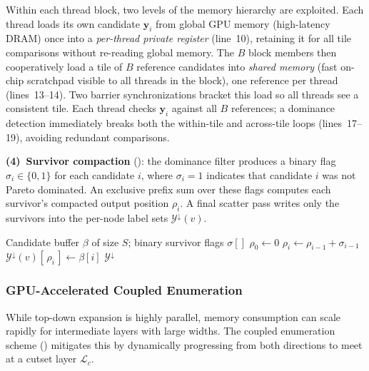 \documentclass[letterpaper]{article}
\begin{document}
Within each thread block, two levels of the memory hierarchy are exploited. Each thread loads its own candidate $\mathbf{y}_i$ from global GPU memory (high-latency DRAM) once into a \emph{per-thread private register} (line~10), retaining it for all tile comparisons without re-reading global memory. The $B$ block members then cooperatively load a tile of $B$ reference candidates into \emph{shared memory} (fast on-chip scratchpad visible to all threads in the block), one reference per thread (lines~13--14). Two barrier synchronizations bracket this load so all threads see a consistent tile. Each thread checks $\mathbf{y}_i$ against all $B$ references; a dominance detection immediately breaks both the within-tile and across-tile loops (lines~17--19), avoiding redundant comparisons.

\textbf{(4)~Survivor compaction} (): the dominance filter produces a binary flag $\sigma_i \in \{0, 1\}$ for each candidate $i$, where $\sigma_i = 1$ indicates that candidate $i$ was not Pareto dominated. An exclusive prefix sum over these flags computes each survivor's compacted output position $\rho_i$. A final scatter pass writes only the survivors into the per-node label sets $\mathcal{Y}^{\downarrow}(v)$.

\begin{algorithm}[tbp]
\caption{GPU Subroutine: Compact Survivors}
\label{alg:compact_survivors}
\begin{algorithmic}[1]
\Require Candidate buffer $\beta$ of size $S$; binary survivor flags $\sigma[]$
\State $\rho_0 \gets 0$
 
    \State $\rho_i \gets \rho_{i-1} + \sigma_{i-1}$
\EndFor
{} 
        \State $\mathcal{Y}^{\downarrow}(v)[\,\rho_i\,] \gets \beta[i]$ 
    \EndIf
\EndFor
\State \Return $\mathcal{Y}^{\downarrow}$
\EndProcedure
\end{algorithmic}
\end{algorithm}

\subsubsection{GPU-Accelerated Coupled Enumeration}
While top-down expansion is highly parallel, memory consumption can scale rapidly for intermediate layers with large widths. The coupled enumeration scheme () mitigates this by dynamically progressing from both directions to meet at a cutset layer $\mathcal{L}_c$.
\end{document}
